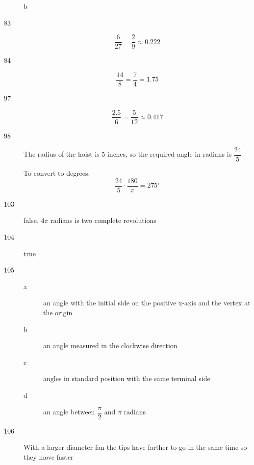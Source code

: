 \documentclass[fleqn,addpoints]{exam}
\newcommand{\degree}{\ensuremath{^\circ}}
\begin{document}
\begin{description}
\begin{description}
\item[b] 

\end{description}

\item[83]
\[
  \frac{6}{27} = \frac{2}{9} \approx 0.222
\]

\item[84]
\[
  \frac{14}{8} = \frac{7}{4} = 1.75 
\]

\item[97]
\[
  \frac{2.5}{6} = \frac{5}{12} \approx 0.417 
\]

\item[98]
The radius of the hoist is 5 inches, so the required angle in radians is $\dfrac{24}{5}$

To convert to degrees:
\[
  \frac{24}{5} \cdot \frac{180}{\pi} = 275 \degree
\]

\item[103]
false.  $4 \pi$ radians is two complete revolutions

\item[104]
true

\item[105]
\begin{description}
\item[a] an angle with the initial side on the positive x-axis and the vertex at the origin
\item[b] an angle measured in the clockwise direction
\item[c] angles in standard position with the same terminal side
\item[d] an angle between $\dfrac{\pi}{2}$ and $\pi$ radians
\end{description}

\item[106]
With a larger diameter fan the tips have farther to go in the same time so they move faster
\end{description}
\end{document}
